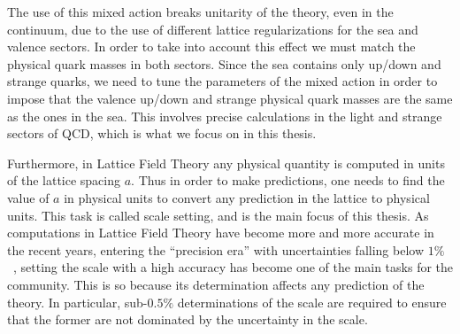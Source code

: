The use of this mixed action breaks unitarity of the theory, even in the continuum, due to the use of different lattice regularizations for the sea and valence sectors. In order to take into account this effect we must match the physical quark masses in both sectors. Since the sea contains only up/down and strange quarks, we need to tune the parameters of the mixed action in order to impose that the valence up/down and strange physical quark masses are the same as the ones in the sea. This involves precise calculations in the light and strange sectors of QCD, which is what we focus on in this thesis.

Furthermore, in Lattice Field Theory any physical quantity is computed in units of the lattice spacing $a$. Thus in order to make predictions, one needs to find the value of $a$ in physical units to convert any prediction in the lattice to physical units. This task is called scale setting, and is the main focus of this thesis. As computations in Lattice Field Theory have become more and more accurate in the recent years, entering the ``precision era'' with uncertainties falling below $1\%$~\citep{Borsanyi Nature 593}, setting the scale with a high accuracy has become one of the main tasks for the community. This is so because its determination affects any prediction of the theory. In particular, sub-$0.5\%$ determinations of the scale are required to ensure that the former are not dominated by the uncertainty in the scale.

